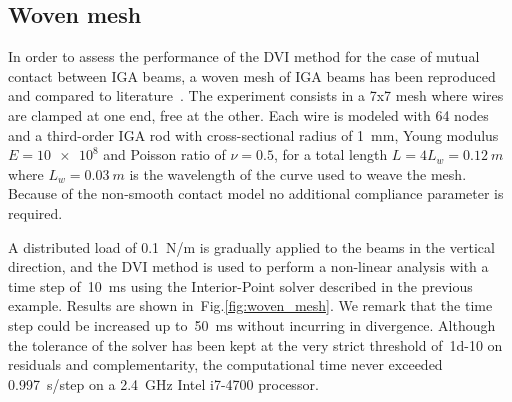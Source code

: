 \documentclass[review]{elsarticle}
\begin{document}


\subsection{Woven mesh}
In order to assess the performance of the DVI method for the case of mutual contact between IGA beams, a woven mesh of IGA beams has been reproduced and compared to literature~\cite{weeger2018frictional}.
The experiment consists in a 7x7 mesh where wires are clamped at one end, free at the other. Each wire is modeled with 64 nodes and a third-order IGA rod with cross-sectional radius of \SI{1}{mm}, Young modulus $E = \num{10e8}$ and Poisson ratio of $\nu = \num{0.5}$, for a total length $L = 4L_w = \SI{0.12}{m}$ where $L_w = \SI{0.03}{m}$ is the wavelength of the curve used to weave the mesh. Because of the non-smooth contact model no additional compliance parameter is required.

A distributed load of \SI{0.1}{N/m} is gradually applied to the beams in the vertical direction, and the DVI method is used to perform a non-linear analysis with a time step of~\SI{10}{ms} using the Interior-Point solver described in the previous example. Results are shown in~Fig.\ref{fig:woven_mesh}. %
We remark that the time step could be increased up to~\SI{50}{ms} without incurring in divergence. Although the tolerance of the solver has been kept at the very strict threshold of~\num{1d-10} on residuals and complementarity, the computational time never exceeded \SI{0.997}{s/step} on a \SI{2.4}{GHz} Intel i7-4700 processor. %
\end{document}
